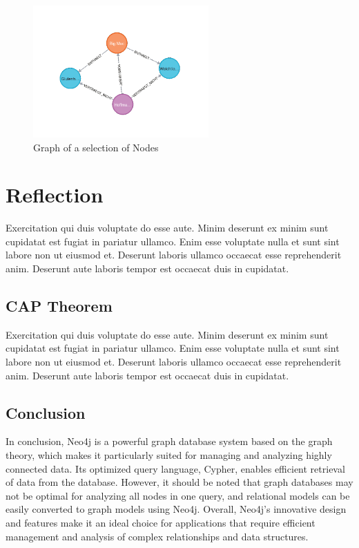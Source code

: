 \begin{figure}[H]
    \centering
    \caption{Graph of a selection of Nodes} \label{fig:neo4jGraph_2}
    \includegraphics[width=0.6\textwidth]{images/neo4j_example_graph_2.png}
\end{figure}

\section{Reflection} \label{sec:reflectionNeo4j}

Exercitation qui duis voluptate do esse aute. Minim deserunt ex minim sunt cupidatat est fugiat in pariatur ullamco. Enim esse voluptate nulla et sunt sint labore non ut eiusmod et. Deserunt laboris ullamco occaecat esse reprehenderit anim. Deserunt aute laboris tempor est occaecat duis in cupidatat.

\subsection{CAP Theorem} \label{subsec:capTheoremNeo4j}

Exercitation qui duis voluptate do esse aute. Minim deserunt ex minim sunt cupidatat est fugiat in pariatur ullamco. Enim esse voluptate nulla et sunt sint labore non ut eiusmod et. Deserunt laboris ullamco occaecat esse reprehenderit anim. Deserunt aute laboris tempor est occaecat duis in cupidatat.

\subsection{Conclusion} \label{subsec:conclusionNeo4j}

In conclusion, Neo4j is a powerful graph database system based on the graph theory, which makes it particularly suited for managing and analyzing highly connected data. Its optimized query language, Cypher, enables efficient retrieval of data from the database. However, it should be noted that graph databases may not be optimal for analyzing all nodes in one query, and relational models can be easily converted to graph models using Neo4j. Overall, Neo4j's innovative design and features make it an ideal choice for applications that require efficient management and analysis of complex relationships and data structures.
